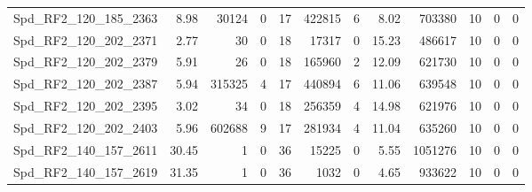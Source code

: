 \begin{longtable}[c]{@{}lrrrrrrrrrrr@{}}
Spd\_RF2\_120\_185\_2363      & 8.98                   & 30124                   & 0                       & 17                     & 422815                  & 6                       & 8.02                    & 703380                   & 10                       & 0                        & 0                        \\
Spd\_RF2\_120\_202\_2371      & 2.77                   & 30                      & 0                       & 18                     & 17317                   & 0                       & 15.23                   & 486617                   & 10                       & 0                        & 0                        \\
Spd\_RF2\_120\_202\_2379      & 5.91                   & 26                      & 0                       & 18                     & 165960                  & 2                       & 12.09                   & 621730                   & 10                       & 0                        & 0                        \\
Spd\_RF2\_120\_202\_2387      & 5.94                   & 315325                  & 4                       & 17                     & 440894                  & 6                       & 11.06                   & 639548                   & 10                       & 0                        & 0                        \\
Spd\_RF2\_120\_202\_2395      & 3.02                   & 34                      & 0                       & 18                     & 256359                  & 4                       & 14.98                   & 621976                   & 10                       & 0                        & 0                        \\
Spd\_RF2\_120\_202\_2403      & 5.96                   & 602688                  & 9                       & 17                     & 281934                  & 4                       & 11.04                   & 635260                   & 10                       & 0                        & 0                        \\
Spd\_RF2\_140\_157\_2611      & 30.45                  & 1                       & 0                       & 36                     & 15225                   & 0                       & 5.55                    & 1051276                  & 10                       & 0                        & 0                        \\
Spd\_RF2\_140\_157\_2619      & 31.35                  & 1                       & 0                       & 36                     & 1032                    & 0                       & 4.65                    & 933622                   & 10                       & 0                        & 0                        \\

\end{longtable}
